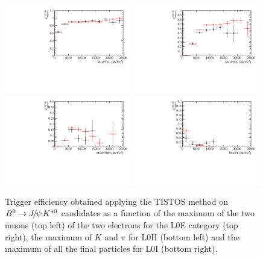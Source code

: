 \begin{figure}[h!]
\centering
\includegraphics[width=0.49\textwidth]{RKst/figs/Efficiencies/efficiencyTisTos_MM.pdf}
\includegraphics[width=0.49\textwidth]{RKst/figs/Efficiencies/efficiencyTisTos_EE_L0E.pdf}
\includegraphics[width=0.49\textwidth]{RKst/figs/Efficiencies/efficiencyTisTos_EE_L0H.pdf}
\includegraphics[width=0.49\textwidth]{RKst/figs/Efficiencies/efficiencyTisTos_EE_L0I.pdf}
\caption{Trigger efficiency obtained applying the TISTOS method on \mbox{$\Bz\to\jpsi\Kstarz$} candidates
as a function of the maximum \pt of the two muons (top left) of the two electrons for the L0E category (top right), 
the maximum \pt of $K$ and $\pi$ for L0H (bottom left) and the maximum \pt of all the final particles for L0I (bottom right).}
\label{fig:tistos_vs_pt}
\end{figure}


